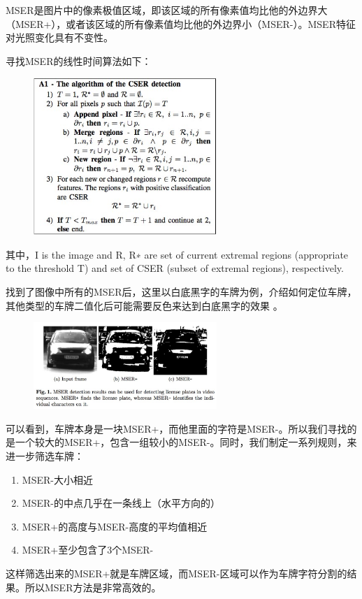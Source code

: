 MSER是图片中的像素极值区域，即该区域的所有像素值均比他的外边界大（MSER+），或者该区域的所有像素值均比他的外边界小（MSER-）。MSER特征对光照变化具有不变性。

寻找MSER的线性时间算法如下：
\begin{figure}[H]
    \centering 
    \includegraphics[width=0.618\textwidth]{image/2_4_1.jpg}    
    \label{logic}
\end{figure}
其中，I is the image and R, R∗ are set of current extremal regions (appropriate to the threshold T) and set of CSER (subset of extremal regions), respectively. 

找到了图像中所有的MSER后，这里以白底黑字的车牌为例，介绍如何定位车牌，其他类型的车牌二值化后可能需要反色来达到白底黑字的效果 。
\begin{figure}[H]
    \centering 
    \includegraphics[width=0.618\textwidth]{image/2_4_2.jpg}    
    \label{logic}
\end{figure}
可以看到，车牌本身是一块MSER+，而他里面的字符是MSER-。所以我们寻找的是一个较大的MSER+，包含一组较小的MSER-。同时，我们制定一系列规则，来进一步筛选车牌：
\begin{enumerate}
\item
MSER-大小相近
\item
MSER-的中点几乎在一条线上（水平方向的）
\item
MSER+的高度与MSER-高度的平均值相近
\item
MSER+至少包含了3个MSER-
\end{enumerate}
这样筛选出来的MSER+就是车牌区域，而MSER-区域可以作为车牌字符分割的结果。所以MSER方法是非常高效的。
